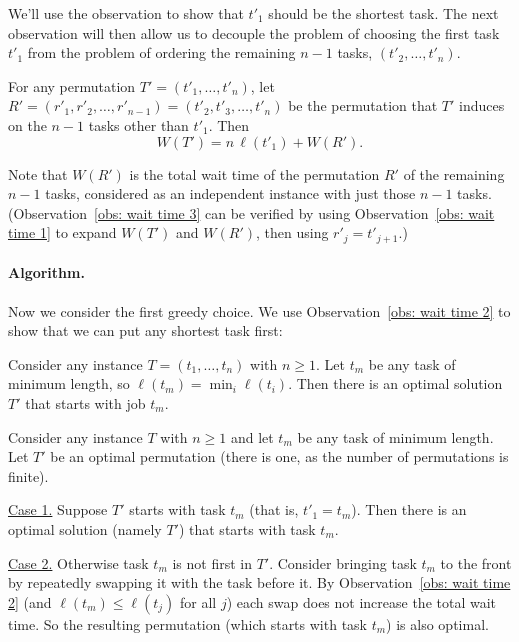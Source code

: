 We'll use the observation to show that $t'_1$ should be the shortest task.
The next observation will then allow us to decouple the problem of choosing the first task $t'_1$
from the problem of ordering the remaining $n-1$ tasks, $(t'_2, \ldots, t'_n)$.
\begin{observation}\label{obs: wait time 3} 
  For any permutation $T'=(t'_1, \ldots, t'_n)$,
  let
  $R'=(r'_1, r'_2, \ldots, r'_{n-1}) = (t'_2, t'_3, \ldots, t'_{n})$
  be the permutation that $T'$ induces on the $n-1$ tasks other than $t'_1$.
  Then
  \[
    W(T') = n\, \ell(t'_1) + W(R').
  \]
\end{observation}
Note that $W(R')$ is the total wait time of the permutation $R'$ of the remaining $n-1$ tasks,
considered as an independent instance with just those $n-1$ tasks.
(Observation~\ref{obs: wait time 3} can be verified by using Observation~\ref{obs: wait time 1}
to expand $W(T')$ and $W(R')$, then using $r'_j = t'_{j+1}$.)

\paragraph{Algorithm.}
Now we consider the first greedy choice.
We use Observation~\ref{obs: wait time 2} to show that
we can put any shortest task first:

\begin{lemma}\label{lemma: wait time 1}
  Consider any instance $T=(t_1, \ldots, t_n)$ with $n\ge 1$.
  Let $t_m$ be any task of minimum length, so $\ell(t_m) = \min_i \ell(t_i)$.
  Then there is an optimal solution $T'$ that starts with job $t_m$.
\end{lemma}
\begin{longFormProof}
  \step Consider any instance $T$ with $n\ge 1$ and let $t_m$ be any task of minimum length.
  \step Let $T'$ be an optimal permutation (there is one, as the number of permutations is finite).
  \begin{block}
    \step \underline{Case 1.} Suppose $T'$ starts with task $t_m$ (that is, $t'_1 = t_m$).
    \step Then there is an optimal solution (namely $T'$) that starts with task $t_m$.
  \end{block}
  \begin{block}
    \step \underline{Case 2.} Otherwise task $t_m$ is not first in $T'$.
    \step Consider bringing task $t_m$ to the front by repeatedly swapping it with the task before it.
    \step By Observation~\ref{obs: wait time 2} (and $\ell(t_m) \le \ell(t_j)$ for all $j$)
    each swap does not increase the total wait time.
    \step So the resulting permutation (which starts with task $t_m$) is also optimal.
  \end{block}
\end{longFormProof}

